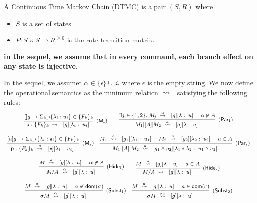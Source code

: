 \begin{definition}
  A Continuous Time Markov Chain (DTMC) is a pair $(S,R)$ where
  \begin{itemize}
  \item $S$ is a set of states
  \item $P: S\times S \rightarrow  R^{\geq 0}$ is the rate
    transition matrix.
  \end{itemize}
\end{definition}

\newpage

{\bf in the sequel, we assume that in every command, each branch
  effect on any state is injective.}


In the sequel, we assumet $\alpha\in\{\epsilon\}\cup \mathcal L$ where
$\epsilon$ is the empty string. We now define the operational
semantics as the minimum relation $\ \stackrel{}{\rightsquigarrow}\ {}$ satisfying the
following rules:
% 
\begin{displaymath}\small
  \begin{array}{ccc}
    \infer[\mathsf{(M_1)}]
    { {\role{p}:\{F_k\}_k} \prismred{}\lab{g}{\lambda_i}{u_i} }
    {\command {}g\lambda u\in\{F_k\}_k}
    \qquad
    \infer[\mathsf{(Par_1)}]
    {M_1\ppp A M_2\prismred{a}\lab g\lambda u }
    {
    \exists j\in\{1,2\}.\ 
    M_j\prismred{\alpha}\lab g\lambda u
    & \alpha\not\in A
    }
    \\\\
    \infer[\mathsf{(M_2)}]
    { {\role{p}:\{F_k\}_k} \prismred{a}\lab{g}{\lambda_i}{u_i} }
    {\command ag\lambda u\in\{F_k\}_k}
    \quad
    \infer[\mathsf{(Par_2)}]
    {M_1\ppp A M_2\prismred{a}\lab{g_1\land g_2}{\lambda_1*\lambda_2}{u_1\land u_2} }
    {
    M_1\prismred{a}\lab{g_1}{\lambda_1}{u_1} 
    & M_2\prismred{a}\lab{g_2}{\lambda_2}{u_2} 
                 & a\in A}
    \\\\\
    \infer[\mathsf{(Hide_1)}]
    {
    M/A\prismred{\alpha}\lab g\lambda u
    }
    {
    M\prismred{\alpha}\lab g\lambda u
    & \alpha\not\in A
    }
    \qquad
    \infer[\mathsf{(Hide_2)}]
    {
    M/A\prismred{}\lab g\lambda u
    }
    {
    M\prismred{a}\lab g\lambda u
    & a\in A
    }
    \\\\
    \infer[\mathsf{(Subst_1)}]
    {
    \sigma M\prismred{\alpha}\lab g\lambda u
    }
    {
    M\prismred{\alpha}\lab g\lambda u
    & \alpha\not\in\mathsf{dom}(\sigma)
      }
    \quad
    \infer[\mathsf{(Subst_2)}]
    {
    \sigma M\prismred{\sigma a}\lab g\lambda u
    }
    {
    M\prismred{a}\lab g\lambda u
    & a\in\mathsf{dom}(\sigma)
      }
    
  \end{array}
\end{displaymath}

